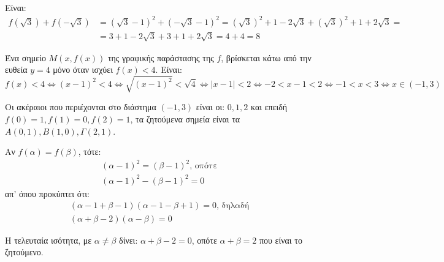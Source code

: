 
\begin{alist}
\item Είναι:
\begin{align*}
f(\sqrt{3}) + f(-\sqrt{3}) &= (\sqrt{3} - 1)^2 + (-\sqrt{3} - 1)^2 = (\sqrt{3})^2 + 1 - 2\sqrt{3} + (\sqrt{3})^2 + 1 + 2\sqrt{3} =\\&= 3 + 1 - 2\sqrt{3} + 3 + 1 + 2\sqrt{3} = 4 + 4 = 8
\end{align*}

\item Ένα σημείο $M(x, f(x))$ της γραφικής παράστασης της $f$, βρίσκεται κάτω από την ευθεία $y = 4$ μόνο όταν ισχύει $f(x) < 4$.
Είναι:
\[f(x) < 4 \Leftrightarrow (x - 1)^2 < 4 \Leftrightarrow \sqrt{(x - 1)^2} < \sqrt{4} \Leftrightarrow |x - 1| < 2 \Leftrightarrow -2 < x - 1 < 2 \Leftrightarrow -1 < x < 3 \Leftrightarrow x \in (-1, 3)\]

Οι ακέραιοι που περιέχονται στο διάστημα $(-1, 3)$ είναι οι: $0, 1, 2$ και επειδή
$f(0) = 1, f(1) = 0, f(2) = 1$, τα ζητούμενα σημεία είναι τα $A(0, 1), B(1, 0), \Gamma(2, 1)$.

\item Αν $f(\alpha) = f(\beta)$, τότε:
\begin{gather*}
(\alpha - 1)^2 = (\beta - 1)^2\text{, οπότε} \\
(\alpha - 1)^2 - (\beta - 1)^2 = 0
\end{gather*}
απ’ όπου προκύπτει ότι:
\begin{gather*}
(\alpha - 1 + \beta - 1)(\alpha - 1 - \beta + 1) = 0\text{, δηλαδή} \\
(\alpha + \beta - 2)(\alpha - \beta) = 0
\end{gather*}

Η τελευταία ισότητα, με $\alpha \ne \beta$ δίνει:
$\alpha + \beta - 2 = 0$, οπότε $\alpha + \beta = 2$
που είναι το ζητούμενο.
\end{alist}

